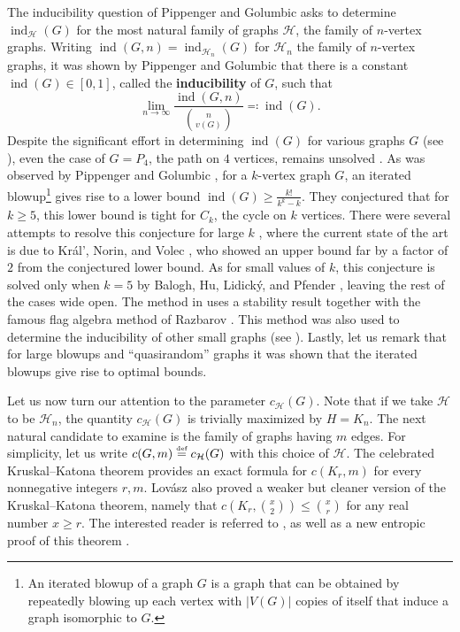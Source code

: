 \documentclass[reqno,11pt]{amsart}
\numberwithin{equation}{section}
\theoremstyle{definition}
\theoremstyle{remark}
\newcommand{\abs}[1]{\left\lvert#1\right\rvert}
\DeclareMathOperator{\ind}{ind}
\newcommand*{\eqdef}{\stackrel{\mbox{\normalfont\tiny def}}{=}}
\newcommand{\cH}{\mathcal{H}}
\begin{document}
The inducibility question of Pippenger and Golumbic \cite{PipGol1975} asks to determine $\ind_{\mathcal{H}}(G)$ for the most natural family of graphs $\mathcal{H}$, the family of $n$-vertex graphs. Writing $\ind(G,n) = \ind_{\mathcal{H}_n}(G)$ for $\mathcal{H}_n$ the family of $n$-vertex graphs, it was shown by Pippenger and Golumbic that there is a constant $\ind(G)\in [0,1]$, called the \textbf{inducibility} of $G$, such that 
\[
	\lim_{n\to \infty} \frac{\ind(G,n)}{\binom{n}{v(G)}} \eqqcolon \ind(G).
\]  
Despite the significant effort in determining $\ind(G)$ for various graphs $G$ (see \cite{BalHuLidPfe2016,BonPik2025, BolEgaHarJin1995, EveLin2015, HatHirNor2014, HefTyo2018,Hir2014, KraNorVol2019, MorSco2017, PikSliTyr2019, Uel2024, Yus2019}), even the case of $G=P_4$, the path on $4$ vertices, remains unsolved \cite{EveLin2015}. As was observed by Pippenger and Golumbic \cite{PipGol1975}, for a $k$-vertex graph $G$, an iterated blowup\footnote{An iterated blowup of a graph $G$ is a graph that can be obtained by repeatedly blowing up each vertex with $\abs{V(G)}$ copies of itself that induce a graph isomorphic to $G$.} gives rise to a lower bound $\ind(G)\geq \frac{k!}{k^k-k}$. They conjectured that for $k\geq 5$, this lower bound is tight for $C_k$, the cycle on $k$ vertices. There were several attempts to resolve this conjecture for large $k$ \cite{HefTyo2018,MorSco2017,PipGol1975}, where the current state of the art is due to Kr\'al', Norin, and Volec \cite{KraNorVol2019}, who showed an upper bound far by a factor of $2$ from the conjectured lower bound. As for small values of $k$, this conjecture is solved only when $k=5$ by Balogh, Hu, Lidick\'y, and Pfender \cite{BalHuLidPfe2016}, leaving the rest of the cases wide open. The method in \cite{BalHuLidPfe2016} uses a stability result together with the famous flag algebra method of Razbarov \cite{Raz2007}. This method was also used to determine the inducibility of other small graphs (see \cite{BonPik2025,EveLin2015,Hir2014,PikSliTyr2019}). 
Lastly, let us remark that for large blowups \cite{HatHirNor2014} and ``quasirandom'' graphs \cite{FoxSauWei2021,Yus2019} it was shown that the iterated blowups give rise to optimal bounds.

Let us now turn our attention to the parameter $c_{\mathcal{H}}(G)$. Note that if we take $\mathcal{H}$ to be $\mathcal{H}_n$, the quantity $c_{\mathcal{H}}(G)$ is trivially maximized by $H=K_n$. The next natural candidate to examine is the family of graphs having $m$ edges. 
For simplicity, let us write $c(G,m)\eqdef c_{\mathcal{H}}(G)$ with this choice of $\cH$. 
The celebrated Kruskal--Katona theorem \cite{Kat68,Kru63} provides an exact formula for $c(K_r,m)$ for every nonnegative integers $r,m$.
Lov\'asz also proved a weaker but cleaner version of the Kruskal--Katona theorem, namely that $c\left(K_r,\binom{x}{2}\right)\leq \binom{x}{r}$ for any real number $x\geq r$.
The interested reader is referred to \cite[Chapter 13, Exercise 31b]{Lovasz93}, as well as a new entropic proof of this theorem \cite{ChaYu2024KK}. 
\end{document}
